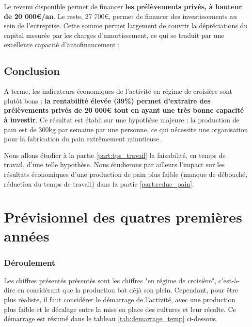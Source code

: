\documentclass{book}
\begin{document}
Le revenu disponible permet de financer \textbf{les prélèvements privés, à hauteur de 20 000\euro{}/an}. Le reste, 27 700\euro{}, permet de financer des investissements au sein de l'entreprise. Cette somme permet largement de couvrir la dépréciations du capital mesurée par les charges d'amortissement, ce qui se traduit par une excellente capacité d'autofinancement :

\noindent{}

\subsection{Conclusion}

A terme, les indicateurs économiques de l'activité en régime de croisière sont plutôt bons : \textbf{la rentabilité élevée (39\%) permet d'extraire des prélèvements privés de 20 000\euro{} tout en ayant une très bonne capacité à investir}. Ce résultat est établi sur une hypothèse majeure : la production de pain est de 300kg par semaine par une personne, ce qui nécessite une organisation pour la fabrication du pain extrêmement minutieuse. 

Nous allons étudier à la partie \ref{part:tps_travail} la faisabilité, en temps de travail, d'une telle hypothèse. Nous étudierons par ailleurs l'impact sur les résultats économiques d'une production de pain plus faible (manque de débouché, réduction du temps de travail) dans la partie \ref{part:reduc_pain}.

\section{Prévisionnel des quatres premières années}
\label{part:previsionnel}

\subsubsection{Déroulement}

Les chiffres présentés présentés sont les chiffres "en régime de croisière", c'est-à-dire en considérant que la production bat déjà son plein. Cependant, pour être plus réaliste, il faut considérer le démarrage de l'activité, avec une production plus faible et le décalage entre la mise en place des cultures et leur récolte. Ce démarrage est résumé dans le tableau \ref{tab:demarrage_temp} ci-dessous.
\end{document}
